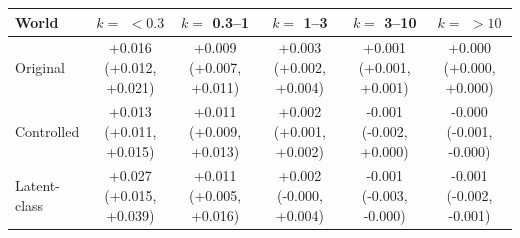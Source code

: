 \begin{tabular}{lccccc}\toprule
World & $k=$ $<0.3$ & $k=$ 0.3--1 & $k=$ 1--3 & $k=$ 3--10 & $k=$ $>10$\\\midrule
Original & +0.016 (+0.012, +0.021) & +0.009 (+0.007, +0.011) & +0.003 (+0.002, +0.004) & +0.001 (+0.001, +0.001) & +0.000 (+0.000, +0.000)\\
Controlled & +0.013 (+0.011, +0.015) & +0.011 (+0.009, +0.013) & +0.002 (+0.001, +0.002) & -0.001 (-0.002, +0.000) & -0.000 (-0.001, -0.000)\\
Latent-class & +0.027 (+0.015, +0.039) & +0.011 (+0.005, +0.016) & +0.002 (-0.000, +0.004) & -0.001 (-0.003, -0.000) & -0.001 (-0.002, -0.001)\\
\bottomrule\end{tabular}